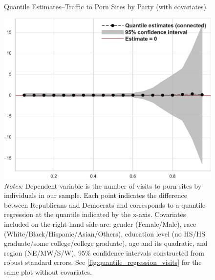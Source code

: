 \documentclass[12pt, letterpaper]{article}
\begin{document}
\begin{figure}
	\centering
	\caption{Quantile Estimates--Traffic to Porn Sites by Party (with covariates)}
	\includegraphics[width=.55\linewidth]{../figs/quantile_reg_covariates_visits_adult.pdf}
	\caption*{\footnotesize \emph{Notes:} 
		Dependent variable is the number of visits to porn sites by individuals in our sample.
		Each point indicates the difference between Republicans and Democrats and corresponds to a quantile regression at the quantile indicated by the x-axis.
		Covariates included on the right-hand side are: gender (Female/Male), race (White/Black/Hispanic/Asian/Others), education level (no HS/HS graduate/some college/college graduate), age and its quadratic, and region (NE/MW/S/W).
		95\% confidence intervals constructed from robust standard errors.
		See \cref{fig:quantile_regression_visits} for the same plot without covariates.
	}
	\label{fig:quantile_regression_visits_covariates}
\end{figure}
\end{document}
